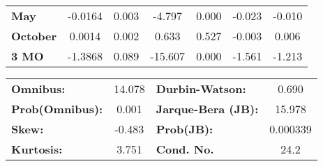 \begin{center}
\begin{tabular}{lcccccc}
\textbf{May}      &      -0.0164  &        0.003     &    -4.797  &         0.000        &       -0.023    &       -0.010     \\
\textbf{October}  &       0.0014  &        0.002     &     0.633  &         0.527        &       -0.003    &        0.006     \\
\textbf{3 MO}     &      -1.3868  &        0.089     &   -15.607  &         0.000        &       -1.561    &       -1.213     \\
\bottomrule
\end{tabular}
\begin{tabular}{lclc}
\textbf{Omnibus:}       & 14.078 & \textbf{  Durbin-Watson:     } &    0.690  \\
\textbf{Prob(Omnibus):} &  0.001 & \textbf{  Jarque-Bera (JB):  } &   15.978  \\
\textbf{Skew:}          & -0.483 & \textbf{  Prob(JB):          } & 0.000339  \\
\textbf{Kurtosis:}      &  3.751 & \textbf{  Cond. No.          } &     24.2  \\
\bottomrule
\end{tabular}
\end{center}

